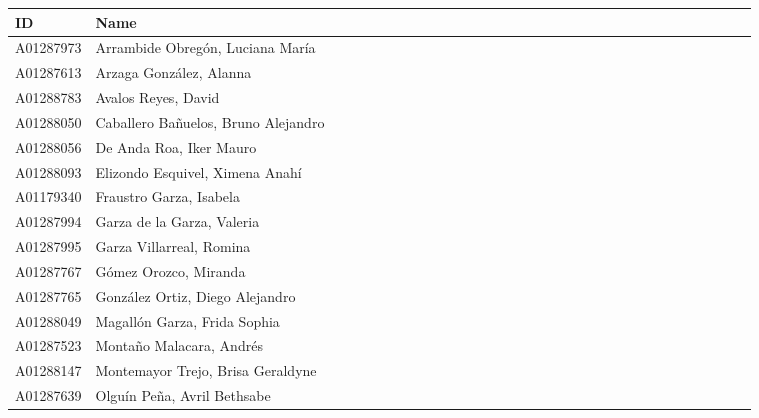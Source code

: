 \documentclass{article}
\begin{document}
\begin{table}[!ht]
    \centering
    \begin{tabular}{|l|l|l|l|l|l|l|l|l|l|l|l|l|l|l|l|l|l|l|l|l|l|l|l|l|l|l|l|l|l|l|l|}
    \hline
        ID & Name & & & & & & & & & & & & & & & & & & & & & & & & & & & & &\\ \hline
        A01287973 & Arrambide Obregón, Luciana María  & & & & & & & & & & & & & & & & & & & & & & & & & & & & &\\ \hline
        A01287613 & Arzaga González, Alanna & & & & & & & & & & & & & & & & & & & & & & & & & & & & &\\ \hline
        A01288783 & Avalos Reyes, David & & & & & & & & & & & & & & & & & & & & & & & & & & & & &\\ \hline
        A01288050 & Caballero Bañuelos, Bruno Alejandro & & & & & & & & & & & & & & & & & & & & & & & & & & & & &\\ \hline
        A01288056 & De Anda Roa, Iker Mauro & & & & & & & & & & & & & & & & & & & & & & & & & & & & &\\ \hline
        A01288093 & Elizondo Esquivel, Ximena Anahí & & & & & & & & & & & & & & & & & & & & & & & & & & & & &\\ \hline
        A01179340 & Fraustro Garza, Isabela & & & & & & & & & & & & & & & & & & & & & & & & & & & & &\\ \hline
        A01287994 & Garza de la Garza, Valeria & & & & & & & & & & & & & & & & & & & & & & & & & & & & &\\ \hline
        A01287995 & Garza Villarreal, Romina & & & & & & & & & & & & & & & & & & & & & & & & & & & & &\\ \hline
        A01287767 & Gómez Orozco, Miranda & & & & & & & & & & & & & & & & & & & & & & & & & & & & &\\ \hline
        A01287765 & González Ortiz, Diego Alejandro & & & & & & & & & & & & & & & & & & & & & & & & & & & & &\\ \hline
        A01288049 & Magallón Garza, Frida Sophia & & & & & & & & & & & & & & & & & & & & & & & & & & & & &\\ \hline
        A01287523 & Montaño Malacara, Andrés & & & & & & & & & & & & & & & & & & & & & & & & & & & & &\\ \hline
        A01288147 & Montemayor Trejo, Brisa Geraldyne & & & & & & & & & & & & & & & & & & & & & & & & & & & & &\\ \hline
        A01287639 & Olguín Peña, Avril Bethsabe & & & & & & & & & & & & & & & & & & & & & & & & & & & & &\\ \hline

\end{tabular}
\end{table}
\end{document}
